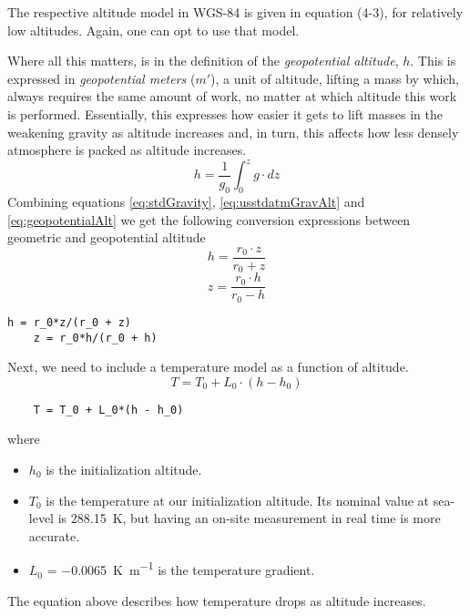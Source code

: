 The respective altitude model in WGS-84 is given in equation (4-3), for relatively low altitudes. Again, one can opt to use that model.

Where all this matters, is in the definition of the \emph{geopotential altitude}, $h$. This is expressed in \emph{geopotential meters} ($m'$), a unit of altitude, lifting a mass by which, always requires the same amount of work, no matter at which altitude this work is performed. Essentially, this expresses how easier it gets to lift masses in the weakening gravity as altitude increases and, in turn, this affects how less densely atmosphere is packed as altitude increases.
\begin{equation} \label{eq:geopotentialAlt}
	h = \frac{1}{g_0}\int_{0}^{z}g\cdot dz
\end{equation}
Combining equations \ref{eq:stdGravity}, \ref{eq:usstdatmGravAlt} and \ref{eq:geopotentialAlt} we get the following conversion expressions between geometric and geopotential altitude
\begin{equation}
	h = \frac{r_0 \cdot z}{r_0 + z}
\end{equation}
\begin{equation}
	z = \frac{r_0 \cdot h}{r_0 - h}
\end{equation}

\begin{lstlisting}[style=C-style]
	h = r_0*z/(r_0 + z)
	z = r_0*h/(r_0 + h)
\end{lstlisting}

Next, we need to include a temperature model as a function of altitude.
\begin{equation}
	T = T_0 + L_0 \cdot (h - h_0)
\end{equation}

\begin{lstlisting}
	T = T_0 + L_0*(h - h_0)
\end{lstlisting}

where
\begin{itemize}
	\item $h_0$ is the initialization altitude.
	\item $T_0$ is the temperature at our initialization altitude. Its nominal value at sea-level is \SI{288.15}{\kelvin}, but having an on-site measurement in real time is more accurate.
	\item $L_0$ = \SI{-0.0065}{\kelvin\per\meter} is the temperature gradient.
\end{itemize}
The equation above describes how temperature drops as altitude increases.

